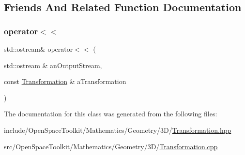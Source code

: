 \subsection{Friends And Related Function Documentation}
\mbox{\label{classostk_1_1math_1_1geom_1_1d3_1_1_transformation_afb2829e106dc4aeab1c706d1eaa357e8}} 
\subsubsection{\texorpdfstring{operator$<$$<$}{operator<<}}
{\footnotesize\ttfamily std\+::ostream\& operator$<$$<$ (\begin{DoxyParamCaption}\item[{std\+::ostream \&}]{an\+Output\+Stream,  }\item[{const \hyperlink{classostk_1_1math_1_1geom_1_1d3_1_1_transformation}{Transformation} \&}]{a\+Transformation }\end{DoxyParamCaption})\hspace{0.3cm}{\ttfamily [friend]}}



The documentation for this class was generated from the following files\+:\begin{DoxyCompactItemize}
\item 
include/\+Open\+Space\+Toolkit/\+Mathematics/\+Geometry/3\+D/\hyperlink{3_d_2_transformation_8hpp}{Transformation.\+hpp}\item 
src/\+Open\+Space\+Toolkit/\+Mathematics/\+Geometry/3\+D/\hyperlink{3_d_2_transformation_8cpp}{Transformation.\+cpp}\end{DoxyCompactItemize}
